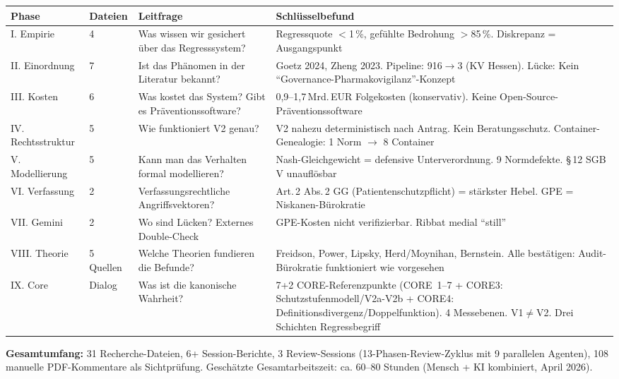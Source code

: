 \documentclass{umbruch-position}
\begin{document}
{\small
\begin{tabularx}{\textwidth}{l l X X}
\toprule
\textbf{Phase} & \textbf{Dateien} & \textbf{Leitfrage} & \textbf{Schlüsselbefund} \\
\midrule
I. Empirie & 4 & Was wissen wir gesichert über das Regresssystem? & Regressquote $<$1\,\%, gefühlte Bedrohung $>$85\,\%. Diskrepanz = Ausgangspunkt \\
\addlinespace
II. Einordnung & 7 & Ist das Phänomen in der Literatur bekannt? & Goetz 2024, Zheng 2023. Pipeline: 916$\to$3 (KV Hessen). Lücke: Kein ``Governance-Pharmakovigilanz''-Konzept \\
\addlinespace
III. Kosten & 6 & Was kostet das System? Gibt es Präventionssoftware? & 0,9--1,7\,Mrd.\,EUR Folgekosten (konservativ). Keine Open-Source-Präventionssoftware \\
\addlinespace
IV. Rechtsstruktur & 5 & Wie funktioniert V2 genau? & V2 nahezu deterministisch nach Antrag. Kein Beratungsschutz. Container-Genealogie: 1 Norm $\to$ 8 Container \\
\addlinespace
V. Modellierung & 5 & Kann man das Verhalten formal modellieren? & Nash-Gleichgewicht = defensive Unterverordnung. 9 Normdefekte. \S\,12 SGB\,V unauflösbar \\
\addlinespace
VI. Verfassung & 2 & Verfassungsrechtliche Angriffsvektoren? & Art.\,2 Abs.\,2 GG (Patientenschutzpflicht) = stärkster Hebel. GPE = Niskanen-Bürokratie \\
\addlinespace
VII. Gemini & 2 & Wo sind Lücken? Externes Double-Check & GPE-Kosten nicht verifizierbar. Ribbat medial ``still'' \\
\addlinespace
VIII. Theorie & 5 Quellen & Welche Theorien fundieren die Befunde? & Freidson, Power, Lipsky, Herd/Moynihan, Bernstein. Alle bestätigen: Audit-Bürokratie funktioniert wie vorgesehen \\
\addlinespace
IX. Core & Dialog & Was ist die kanonische Wahrheit? & 7+2 CORE-Referenzpunkte (CORE~1--7 + CORE3: Schutzstufenmodell/V2a-V2b + CORE4: Definitionsdivergenz/Doppelfunktion). 4 Messebenen. V1$\neq$V2. Drei Schichten Regressbegriff \\
\bottomrule
\end{tabularx}
}

\textbf{Gesamtumfang:} 31 Recherche-Dateien, 6+ Session-Berichte, 3 Review-Sessions (13-Phasen-Review-Zyklus mit 9 parallelen Agenten), 108 manuelle PDF-Kommentare als Sichtprüfung. Geschätzte Gesamtarbeitszeit: ca. 60--80 Stunden (Mensch + KI kombiniert, April 2026).
\end{document}
